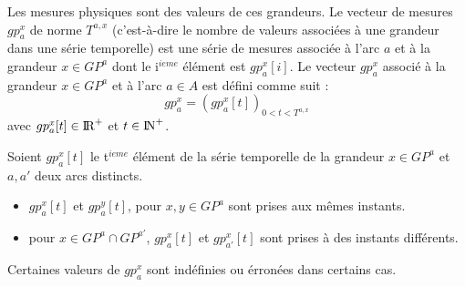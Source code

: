 Les mesures physiques sont des valeurs de ces grandeurs.
Le vecteur de mesures $gp_{a}^{x}$ de norme $T^{a,x}$ (c'est-\`a-dire le nombre de valeurs associ\'ees \`a une grandeur dans une s\'erie temporelle) est une s\'erie de mesures associ\'ee \`a l'arc $a$ et \`a la grandeur $x \in  GP^{a}$ dont le i$^{ieme}$ \'el\'ement est  $gp_{a}^{x}[i]$.
Le vecteur $gp_{a}^{x}$ associ\'e \`a la grandeur $x \in GP^{a}$ et \`a l'arc $a \in A$ est d\'efini comme suit :
\begin{equation}
	gp_{a}^{x} = ( gp_{a}^{x}[t] )_{0 < t < T^{a, x} }
\end{equation}
avec $ gp_{a}^{x}[t] \in \mbox{I\hspace{-.15em}R}^{+}$ et $ t \in \mbox{I\hspace{-.15em}N}^{+}$.
\begin{remark}
\label{remarque} 
Soient  $gp_{a}^{x}[t]$ le t$^{ieme}$ \'el\'ement de la s\'erie temporelle de la grandeur $x \in GP^{a}$ et $a, a'$ deux  arcs distincts.
\begin{itemize}
	\item  $gp_{a}^{x}[t]$ et  $gp_{a}^{y}[t]$, pour $x, y \in GP^{a}$ sont prises aux m\^emes instants.
	\item  pour $x\in GP^{a} \cap GP^{a'}$,  $gp_{a}^{x}[t]$ et  $gp_{a'}^{x}[t]$  sont prises \`a des instants diff\'erents.
\end{itemize}
\end{remark}
Certaines valeurs de $ gp_{a}^{x}$ sont ind\'efinies ou \'erron\'ees dans certains cas.
